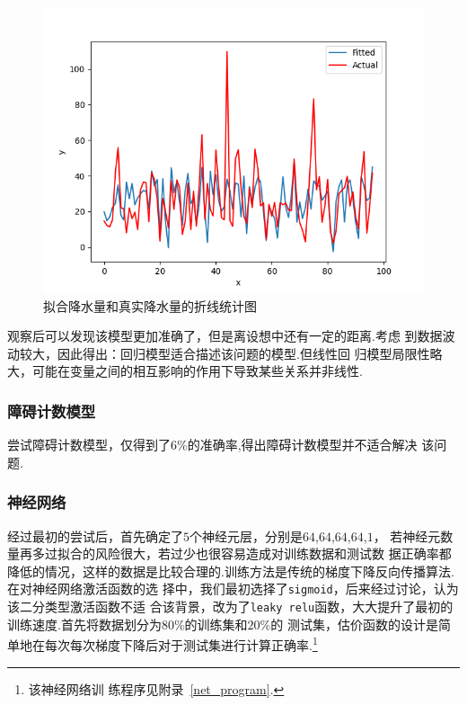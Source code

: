 \documentclass[UTF8, a4paper]{ctexart}
\begin{document}
\begin{figure}[h!]
	\centering
	\includegraphics[scale=0.3]{fit2.png}
	\caption{拟合降水量和真实降水量的折线统计图}
\end{figure}

观察后可以发现该模型更加准确了，但是离设想中还有一定的距离.考虑
到数据波动较大，因此得出：回归模型适合描述该问题的模型.但线性回
归模型局限性略大，可能在变量之间的相互影响的作用下导致某些关系并非线性.

\subsubsection{障碍计数模型}

尝试障碍计数模型，仅得到了$6\%$的准确率,得出障碍计数模型并不适合解决
该问题.

\subsubsection{神经网络}

经过最初的尝试后，首先确定了$5$个神经元层，分别是$64$,$64$,$64$,$64$,$1$，
若神经元数量再多过拟合的风险很大，若过少也很容易造成对训练数据和测试数
据正确率都降低的情况，这样的数据是比较合理的.训练方法是传统的梯度下降反向传播算法.在对神经网络激活函数的选
择中，我们最初选择了\verb+sigmoid+，后来经过讨论，认为该二分类型激活函数不适
合该背景，改为了\verb+leaky relu+函数，大大提升了最初的训练速度.首先将数据划分为$80\%$的训练集和$20\%$的
测试集，估价函数的设计是简单地在每次每次梯度下降后对于测试集进行计算正确率.\footnote{该神经网络训
	练程序见附录~\textcolor{red}{\ref{net_program}}.}
\end{document}
